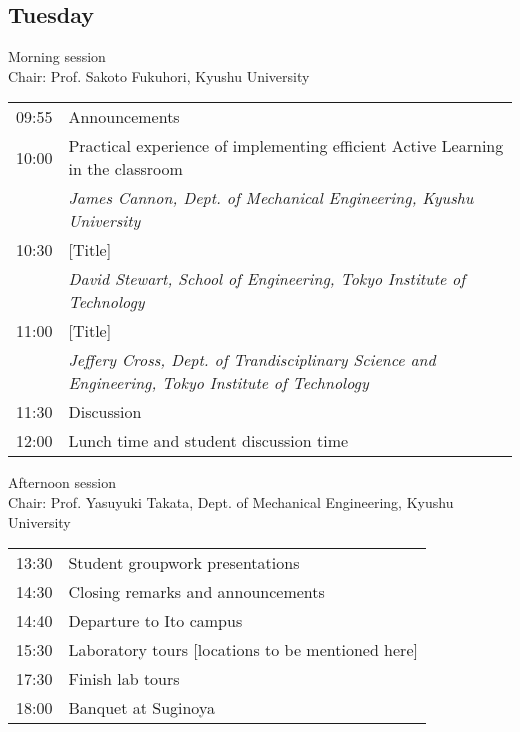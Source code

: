 \subsection*{Tuesday}

\vspace{2em}
Morning session \\
Chair: Prof. Sakoto Fukuhori, Kyushu University

\noindent\begin{tabular}{|l|l|}
    \hline
    09:55   & Announcements \\
    10:00   & Practical experience of implementing efficient Active Learning in the classroom \\
            & \emph{James Cannon, Dept. of Mechanical Engineering, Kyushu University} \\
    10:30   & [Title] \\
            & \emph{David Stewart, School of Engineering, Tokyo Institute of Technology} \\
    11:00   & [Title] \\
            & \emph{Jeffery Cross, Dept. of Trandisciplinary Science and Engineering, Tokyo Institute of Technology} \\
    11:30   & Discussion \\
    12:00   & Lunch time and student discussion time \\

    \hline
\end{tabular}

\noindent Afternoon session \\
Chair: Prof. Yasuyuki Takata, Dept. of Mechanical Engineering, Kyushu University

\noindent\begin{tabular}{|l|l|}
    \hline
    13:30   & Student groupwork presentations \\
    14:30   & Closing remarks and announcements \\
    14:40   & Departure to Ito campus \\
    15:30   & Laboratory tours [locations to be mentioned here] \\
    17:30   & Finish lab tours \\
    18:00   & Banquet at Suginoya \\
    \hline
\end{tabular}
